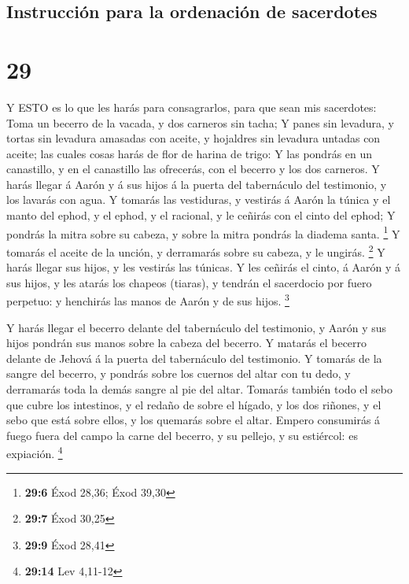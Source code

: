 \hypertarget{instrucciuxf3n-para-la-ordenaciuxf3n-de-sacerdotes}{%
\subsection{Instrucción para la ordenación de
sacerdotes}\label{instrucciuxf3n-para-la-ordenaciuxf3n-de-sacerdotes}}

\hypertarget{section-28}{%
\section{29}\label{section-28}}

 Y ESTO es lo que les harás para consagrarlos, para que sean
mis sacerdotes: Toma un becerro de la vacada, y dos carneros sin tacha;
 Y panes sin levadura, y tortas sin levadura amasadas con
aceite, y hojaldres sin levadura untadas con aceite; las cuales cosas
harás de flor de harina de trigo:  Y las pondrás en un
canastillo, y en el canastillo las ofrecerás, con el becerro y los dos
carneros.  Y harás llegar á Aarón y á sus hijos á la puerta
del tabernáculo del testimonio, y los lavarás con agua.  Y
tomarás las vestiduras, y vestirás á Aarón la túnica y el manto del
ephod, y el ephod, y el racional, y le ceñirás con el cinto del ephod;
 Y pondrás la mitra sobre su cabeza, y sobre la mitra
pondrás la diadema santa. \footnote{\textbf{29:6} Éxod 28,36; Éxod 39,30}
 Y tomarás el aceite de la unción, y derramarás sobre su
cabeza, y le ungirás. \footnote{\textbf{29:7} Éxod 30,25}  Y
harás llegar sus hijos, y les vestirás las túnicas.  Y les
ceñirás el cinto, á Aarón y á sus hijos, y les atarás los chapeos
(tiaras), y tendrán el sacerdocio por fuero perpetuo: y henchirás las
manos de Aarón y de sus hijos. \footnote{\textbf{29:9} Éxod 28,41}

 Y harás llegar el becerro delante del tabernáculo del
testimonio, y Aarón y sus hijos pondrán sus manos sobre la cabeza del
becerro.  Y matarás el becerro delante de Jehová á la
puerta del tabernáculo del testimonio.  Y tomarás de la
sangre del becerro, y pondrás sobre los cuernos del altar con tu dedo, y
derramarás toda la demás sangre al pie del altar.  Tomarás
también todo el sebo que cubre los intestinos, y el redaño de sobre el
hígado, y los dos riñones, y el sebo que está sobre ellos, y los
quemarás sobre el altar.  Empero consumirás á fuego fuera
del campo la carne del becerro, y su pellejo, y su estiércol: es
expiación. \footnote{\textbf{29:14} Lev 4,11-12}

